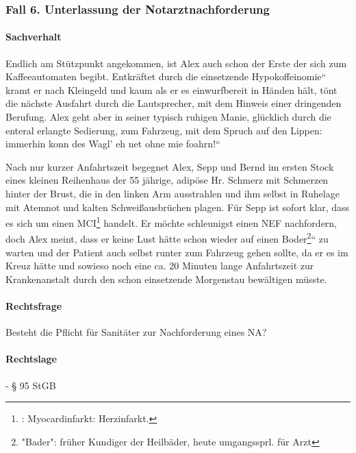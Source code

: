 \subsubsection{Fall 6. Unterlassung der Notarztnachforderung}

\paragraph*{Sachverhalt}

Endlich am St\"utzpunkt angekommen, ist Alex auch schon der Erste der
sich zum Kaffeeautomaten begibt. Entkräftet durch die einsetzende
{\quotedblbase}Hypokoffeinomie{\textquotedblleft} kramt er nach
Kleingeld und kaum als er es einwurfbereit in Händen hält, t\"ont
die nächste Ausfahrt durch die Lautsprecher, mit dem Hinweis einer
dringenden Berufung. Alex geht aber in seiner typisch ruhigen Manie,
gl\"ucklich durch die enteral erlangte Sedierung, zum Fahrzeug, mit dem
Spruch auf den Lippen: {\quotedblbase}immerhin konn des
Wagl{\textquoteright} eh net ohne mie foahrn!{\textquotedblleft}

Nach nur kurzer Anfahrtszeit begegnet Alex, Sepp und Bernd im ersten
Stock eines kleinen Reihenhaus der 55 jährige, adip\"ose Hr. Schmerz
mit Schmerzen hinter der Brust, die in den linken Arm ausstrahlen und
ihm selbst in Ruhelage mit Atemnot und kalten Schwei{\ss}ausbr\"uchen
plagen. F\"ur Sepp ist sofort klar, dass es sich um einen
MCI\footnote{: Myocardinfarkt: Herzinfarkt.} handelt.
Er m\"ochte schleunigst einen NEF nachfordern, doch Alex
meint, dass er keine Lust hätte schon wieder auf
einen {\quotedblbase}Boder\footnote{"Bader": fr\"uher
Kundiger der Heilbäder, heute umgangssprl. f\"ur
Arzt}{\textquotedblleft} zu warten und der Patient auch
selbst runter zum Fahrzeug gehen sollte, da er es im Kreuz
hätte und sowieso noch eine ca. 20 Minuten lange
Anfahrtszeit zur Krankenanstalt durch den schon einsetzende Morgenstau
bewältigen m\"usste.

\paragraph*{Rechtsfrage}

Besteht die Pflicht f\"ur Sanitäter zur Nachforderung eines NA?

\paragraph*{Rechtslage}

 - {\S} 95 StGB

